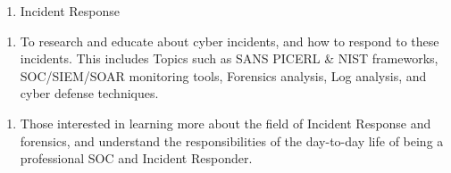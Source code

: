 

\begin{enumerate}
	\item Incident Response
\end{enumerate}


\begin{enumerate}
	\item To research and educate about cyber incidents, and how to respond to these incidents. This includes Topics such as SANS PICERL & NIST frameworks, SOC/SIEM/SOAR monitoring tools, Forensics analysis, Log analysis, and cyber defense techniques.
\end{enumerate}


\begin{enumerate}
	\item Those interested in learning more about the field of Incident Response and forensics, and understand the responsibilities of the day-to-day life of being a professional SOC and Incident Responder.
\end{enumerate}